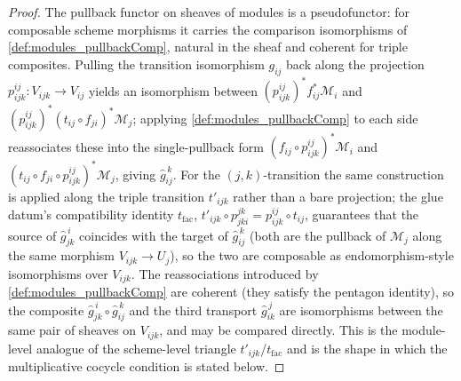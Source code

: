 \begin{proof}
  \leanok
  The pullback functor on sheaves of modules is a pseudofunctor: for composable
  scheme morphisms it carries the comparison isomorphisms of
  \cref{def:modules_pullbackComp}, natural in the sheaf and coherent for triple
  composites. Pulling the transition isomorphism \(g_{ij}\) back along the projection
  \(p^{ij}_{ijk} : V_{ijk} \to V_{ij}\) yields an isomorphism between
  \((p^{ij}_{ijk})^{*} f_{ij}^{*}\mathcal{M}_i\) and \((p^{ij}_{ijk})^{*}(t_{ij} \circ
  f_{ji})^{*}\mathcal{M}_j\); applying \cref{def:modules_pullbackComp} to each side
  reassociates these into the single-pullback form
  \((f_{ij} \circ p^{ij}_{ijk})^{*}\mathcal{M}_i\) and
  \((t_{ij} \circ f_{ji} \circ p^{ij}_{ijk})^{*}\mathcal{M}_j\), giving
  \(\widehat{g}_{ij}^{\,k}\). For the \((j,k)\)-transition the same construction is
  applied along the triple transition \(t'_{ijk}\) rather than a bare projection; the
  glue datum's compatibility identity \(t_{\mathrm{fac}}\),
  \(t'_{ijk} \circ p^{jk}_{jki} = p^{ij}_{ijk} \circ t_{ij}\), guarantees that the
  source of \(\widehat{g}_{jk}^{\,i}\) coincides with the target of
  \(\widehat{g}_{ij}^{\,k}\) (both are the pullback of \(\mathcal{M}_j\) along the same
  morphism \(V_{ijk} \to U_j\)), so the two are composable as endomorphism-style
  isomorphisms over \(V_{ijk}\). The reassociations introduced by
  \cref{def:modules_pullbackComp} are coherent (they satisfy the pentagon identity), so
  the composite \(\widehat{g}_{jk}^{\,i} \circ \widehat{g}_{ij}^{\,k}\) and the third
  transport \(\widehat{g}_{ik}^{\,j}\) are isomorphisms between the same pair of
  sheaves on \(V_{ijk}\), and may be compared directly. This is the module-level
  analogue of the scheme-level triangle \(t'_{ijk}\)/\(t_{\mathrm{fac}}\) and is the
  shape in which the multiplicative cocycle condition is stated below.
\end{proof}


